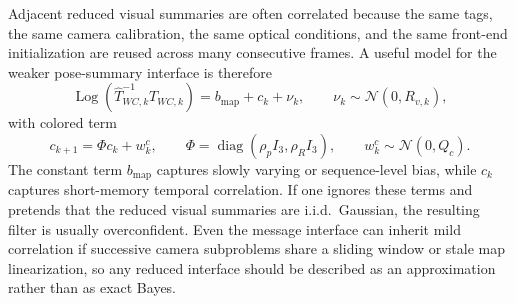 \documentclass[11pt]{report}
\newcommand{\Log}{\operatorname{Log}}
\newcommand{\diag}{\operatorname{diag}}
\begin{document}
Adjacent reduced visual summaries are often correlated because the same tags, the same camera calibration, the same optical conditions, and the same front-end initialization are reused across many consecutive frames. A useful model for the weaker pose-summary interface is therefore
\begin{equation}
\Log\!\left(\widehat T_{WC,k}^{-1}T_{WC,k}\right)=b_{\mathrm{map}}+c_k+\nu_k,
\qquad
\nu_k\sim\mathcal N(0,R_{v,k}),
\label{eq:visual_pseudomeasurement_model_sweep}
\end{equation}
with colored term
\begin{equation}
c_{k+1}=\Phi c_k+w_k^c,
\qquad
\Phi=\diag(\rho_pI_3,\rho_RI_3),
\qquad
w_k^c\sim\mathcal N(0,Q_c).
\label{eq:colored_visual_noise_sweep}
\end{equation}
The constant term $b_{\mathrm{map}}$ captures slowly varying or sequence-level bias, while $c_k$ captures short-memory temporal correlation. If one ignores these terms and pretends that the reduced visual summaries are i.i.d.\ Gaussian, the resulting filter is usually overconfident. Even the message interface can inherit mild correlation if successive camera subproblems share a sliding window or stale map linearization, so any reduced interface should be described as an approximation rather than as exact Bayes.
\end{document}
